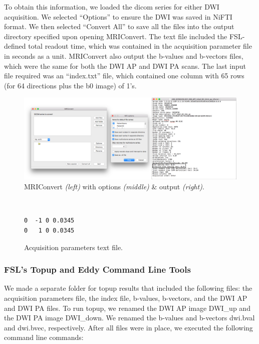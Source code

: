 To obtain this information, we loaded the dicom series for either DWI acquisition. We selected ``Options'' to ensure the DWI was saved in NiFTI format. We then selected ``Convert All'' to save all the files into the output directory specified upon opening MRIConvert. The text file included the FSL-defined total readout time, which was contained in the acquisition parameter file in seconds as a unit. MRIConvert also output the b-values and b-vectors files, which were the same for both the DWI AP and DWI PA scans. The last input file required was an ``index.txt'' file, which contained one column with 65 rows (for 64 directions plus the b0 image) of 1's.

\begin{figure}[H]
    \centering
    \includegraphics[width=\textwidth]{Figures/combined}
    \caption{MRIConvert \textit{(left)} with options \textit{(middle)} \& output \textit{(right)}.}
    \label{fig:mri_convert}
\end{figure}

\begin{figure}[H]
\centering
{\tt
\begin{varwidth}{\linewidth}
\begin{verbatim}
0  -1 0 0.0345
0   1 0 0.0345
\end{verbatim}
\end{varwidth}
}
\label{fig:acq}
\caption{Acquisition parameters text file.}
\end{figure}

\subsubsection{FSL's Topup and Eddy Command Line Tools}

We made a separate folder for topup results that included the following files: the acquisition parameters file, the index file, b-values, b-vectors, and the DWI AP and DWI PA files. To run topup, we renamed the DWI AP image DWI\_up and the DWI PA image DWI\_down. We renamed the b-values and b-vectors dwi.bval and dwi.bvec, respectively. After all files were in place, we executed the following command line commands:

